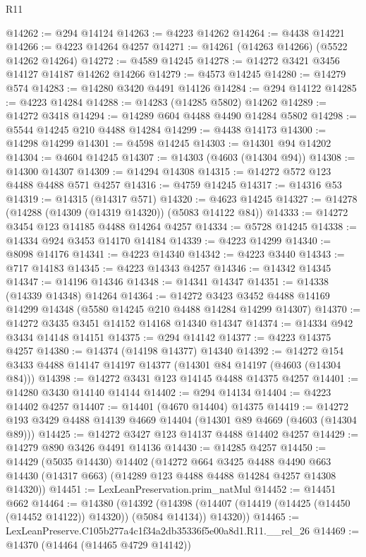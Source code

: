 \begin{lexlean}{R11}
\begin{coremodule}
@14262 := @294 @14124
@14263 := @4223 @14262
@14264 := @4438 @14221
@14266 := @4223 @14264 @4257
@14271 := @14261 (@14263 @14266) (@5522 @14262 @14264)
@14272 := @4589 @14245
@14278 := @14272 @3421 @3456 @14127 @14187 @14262 @14266
@14279 := @4573 @14245
@14280 := @14279 @574
@14283 := @14280 @3420 @4491 @14126
@14284 := @294 @14122
@14285 := @4223 @14284
@14288 := @14283 (@14285 @5802) @14262
@14289 := @14272 @3418
@14294 := @14289 @604 @4488 @4490 @14284 @5802
@14298 := @5544 @14245 @210 @4488 @14284
@14299 := @4438 @14173
@14300 := @14298 @14299
@14301 := @4598 @14245
@14303 := @14301 @94 @14202
@14304 := @4604 @14245
@14307 := @14303 (@4603 (@14304 @94))
@14308 := @14300 @14307
@14309 := @14294 @14308
@14315 := @14272 @572 @123 @4488 @4488 @571 @4257
@14316 := @4759 @14245
@14317 := @14316 @53
@14319 := @14315 (@14317 @571)
@14320 := @4623 @14245
@14327 := @14278 (@14288 (@14309 (@14319 @14320)) (@5083 @14122 @84))
@14333 := @14272 @3454 @123 @14185 @4488 @14264 @4257
@14334 := @5728 @14245
@14338 := @14334 @924 @3453 @14170 @14184
@14339 := @4223 @14299
@14340 := @8098 @14176
@14341 := @4223 @14340
@14342 := @4223 @3440
@14343 := @717 @14183
@14345 := @4223 @14343 @4257
@14346 := @14342 @14345
@14347 := @14196 @14346
@14348 := @14341 @14347
@14351 := @14338 (@14339 @14348) @14264
@14364 := @14272
    @3423
    @3452
    @4488
    @14169
    @14299
    @14348
    (@5580 @14245 @210 @4488 @14284 @14299 @14307)
@14370 := @14272 @3435 @3451 @14152 @14168 @14340 @14347
@14374 := @14334 @942 @3434 @14148 @14151
@14375 := @294 @14142
@14377 := @4223 @14375 @4257
@14380 := @14374 (@14198 @14377) @14340
@14392 := @14272 @154 @3433 @4488 @14147 @14197 @14377 (@14301 @84 @14197 (@4603 (@14304 @84)))
@14398 := @14272 @3431 @123 @14145 @4488 @14375 @4257
@14401 := @14280 @3430 @14140 @14144
@14402 := @294 @14134
@14404 := @4223 @14402 @4257
@14407 := @14401 (@4670 @14404) @14375
@14419 := @14272 @193 @3429 @4488 @14139 @4669 @14404 (@14301 @89 @4669 (@4603 (@14304 @89)))
@14425 := @14272 @3427 @123 @14137 @4488 @14402 @4257
@14429 := @14279 @890 @3426 @4491 @14136
@14430 := @14285 @4257
@14450 := @14429
    (@5035 @14430)
    @14402
    (@14272
      @664
      @3425
      @4488
      @4490
      @663
      @14430
      (@14317 @663)
      (@14289 @123 @4488 @4488 @14284 @4257 @14308 @14320))
@14451 := LexLeanPreservation.prim_natMul
@14452 := @14451 @662
@14464 := @14380
    (@14392
      (@14398 (@14407 (@14419 (@14425 (@14450 (@14452 @14122)) @14320)) (@5084 @14134)) @14320))
@14465 := LexLeanPreserve.C105b277a4c1f34a2db35336f5e00a8d1.R11.__rel_26
@14469 := @14370 (@14464 (@14465 @4729 @14142))

\end{coremodule}
\end{lexlean}
